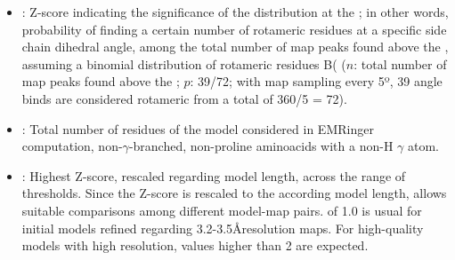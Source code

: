 \begin{itemize}
\begin{itemize}
\begin{itemize}
\begin{itemize}
          \item {}: Z-score indicating the significance of the distribution at the ; in other words, probability of finding a certain number of rotameric residues at a specific side chain dihedral angle, among the total number of map peaks found above the , assuming a binomial distribution of rotameric residues B( ($n$: total number of map peaks found above the ; $p$: 39/72; with map sampling every 5º, 39 angle binds are considered rotameric from a total of 360/5 = 72).
          \item {}: Total number of residues of the model considered in EMRinger computation, non-$\gamma$-branched, non-proline aminoacids with a non-H $\gamma$ atom.
          \item {}: Highest Z-score, rescaled regarding model length, across the range of  thresholds. Since the Z-score is rescaled to the  according model length,  allows suitable comparisons among different model-map pairs.  of 1.0 is usual for initial models refined regarding 3.2-3.5\AA resolution maps. For high-quality models with high resolution,  values higher than 2 are expected.
         \end{itemize}


\end{itemize}
\end{itemize}
\end{itemize}
